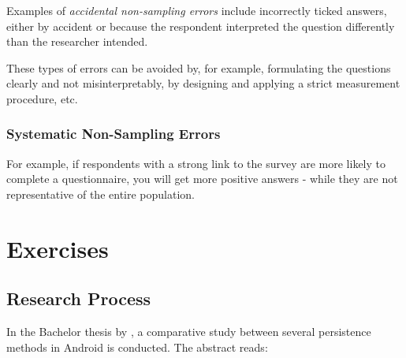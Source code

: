 Examples of \emph{accidental non-sampling errors} include incorrectly ticked answers, either by accident or because the respondent interpreted the question differently than the researcher intended.

These types of errors can be avoided by, for example, formulating the questions clearly and not misinterpretably, by designing and applying a strict measurement procedure, etc.

\subsubsection{Systematic Non-Sampling Errors}

For example, if respondents with a strong link to the survey are more likely to complete a questionnaire, you will get more positive answers - while they are not representative of the entire population.

\section{Exercises}
\label{sec:onderzoeksproces-oefeningen}

\subsection{Research Process}

In the Bachelor thesis by \textcite{Akin2016}, a comparative study between several persistence methods in Android is conducted. The abstract reads:

